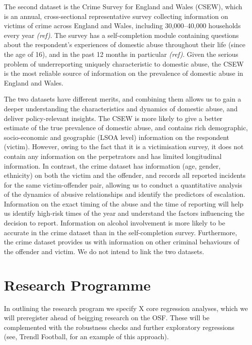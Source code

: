 \documentclass[11pt, a4paper]{article}
\begin{document}
The second dataset is the Crime Survey for England and Wales (CSEW), which is an annual, cross-sectional representative survey collecting information on victims of crime across England and Wales, including 30,000--40,000 households every year \textit{(ref)}. The survey has a self-completion module containing questions about the respondent's experiences of domestic abuse throughout their life (since the age of 16), and in the past 12 months in particular \textit{(ref)}. Given the serious problem of underreporting uniquely characteristic to domestic abuse, the CSEW is the most reliable source of information on the prevalence of domestic abuse in England and Wales.   

The two datasets have different merits, and combining them allows us to gain a deeper understanding the characteristics and dynamics of domestic abuse, and deliver policy-relevant insights. The CSEW is more likely to give a better estimate of the true prevalence of domestic abuse, and contains rich demographic, socio-economic and geographic (LSOA level) information on the respondent (victim). However, owing to the fact that it is a victimisation survey, it does not contain any information on the perpetrators and has limited longitudinal information. In contrast, the crime dataset has information (age, gender, ethnicity) on both the victim and the offender, and records all reported incidents for the same victim-offender pair, allowing us to conduct a quantitative analysis of the dynamics of abusive relationships and identify the predictors of escalation. Information on the exact timing of the abuse and the time of reporting will help us identify high-risk times of the year and understand the factors influencing the decision to report. Information on alcohol involvement is more likely to be accurate in the crime dataset than in the self-completion survey. Furthermore, the crime dataset provides us with information on other criminal behaviours of the offender and victim.  We do not intend to link the two datasets.



\section*{Research Programme}

In outlining the research program we specify X core regression analyses, which we will preregister ahead of beigging research on the OSF. These will be complemented with the robustness checks and further exploratory regressions (see, Trendl Football, for an example of this approach). 
\end{document}
